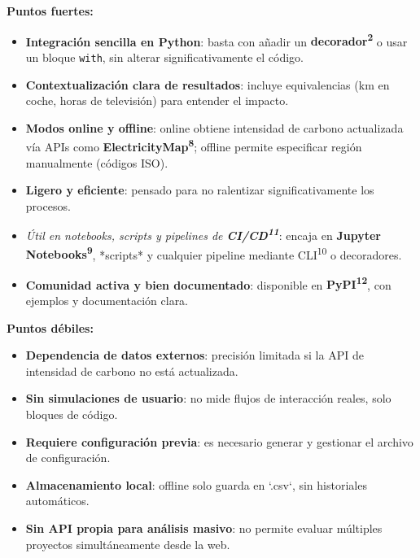 \documentclass[12pt,a4paper]{report}
\begin{document}
\textbf{Puntos fuertes:}
\begin{itemize}
    \item \textbf{Integración sencilla en Python}: basta con añadir un \textbf{decorador\textsuperscript{2}} o usar un bloque \texttt{with}, sin alterar significativamente el código.
    \item \textbf{Contextualización clara de resultados}: incluye equivalencias (km en coche, horas de televisión) para entender el impacto.
    \item \textbf{Modos online y offline}: online obtiene intensidad de carbono actualizada vía APIs como \textbf{ElectricityMap\textsuperscript{8}}; offline permite especificar región manualmente (códigos ISO).
    \item \textbf{Ligero y eficiente}: pensado para no ralentizar significativamente los procesos.
    \item \textit{Útil en notebooks, scripts y pipelines de \textbf{CI/CD\textsuperscript{11}}}: encaja en \textbf{Jupyter Notebooks\textsuperscript{9}}, *scripts* y cualquier pipeline mediante CLI\textsuperscript{10} o decoradores.
    \item \textbf{Comunidad activa y bien documentado}: disponible en \textbf{PyPI\textsuperscript{12}}, con ejemplos y documentación clara.
\end{itemize}

\textbf{Puntos débiles:}
\begin{itemize}
    \item \textbf{Dependencia de datos externos}: precisión limitada si la API de intensidad de carbono no está actualizada.
    \item \textbf{Sin simulaciones de usuario}: no mide flujos de interacción reales, solo bloques de código.
    \item \textbf{Requiere configuración previa}: es necesario generar y gestionar el archivo de configuración.
    \item \textbf{Almacenamiento local}: offline solo guarda en `.csv`, sin historiales automáticos.
    \item \textbf{Sin API propia para análisis masivo}: no permite evaluar múltiples proyectos simultáneamente desde la web.
\end{itemize}
\end{document}
